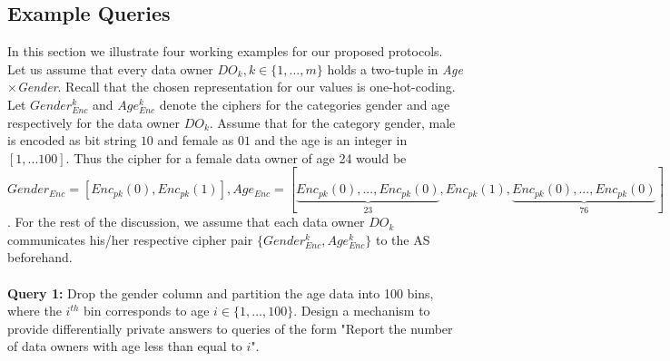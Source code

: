 \subsection{Example Queries}
In this section we illustrate four working examples for our proposed protocols.\\ Let us assume that every data owner $DO_k, k \in\{1,...,m\}$ holds a two-tuple in \textit{Age}$\times$\textit{Gender}. Recall that the chosen representation for our values is one-hot-coding. Let $Gender^k_{Enc}$ and $Age^k_{Enc}$ denote the ciphers for the categories  gender and age respectively for the data owner $DO_k$.  Assume that for the category gender, male is encoded as bit string $10$ and female as $01$ and the age is an integer in $[1,...100]$. Thus the cipher for a female data owner of age 24 would be $Gender_{Enc}=[Enc_{pk}(0),Enc_{pk}(1)], Age_{Enc}=[\underbrace{Enc_{pk}(0),...,Enc_{pk}(0)}_\text{23},Enc_{pk}(1),\underbrace{Enc_{pk}(0),...,Enc_{pk}(0)}_\text{76}]$.   For the rest of the discussion, we assume that each data owner $DO_k$ communicates  his/her respective cipher pair $\{Gender^k_{Enc},Age^k_{Enc}\}$ to the AS beforehand.\\\\
\textbf{Query 1:} Drop the gender column and partition the age data into 100 bins, where the $i^{th}$ bin corresponds to age $i \in \{1,...,100\}$.  Design a mechanism to provide differentially private answers to queries of the form "Report the number of data owners with age less than equal to $i$".
